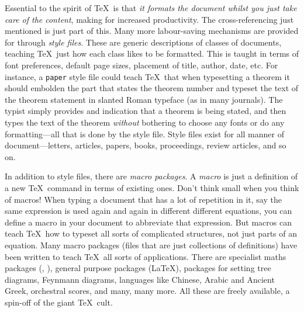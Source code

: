 Essential to the spirit of \TeX\ is that {\em it formats the document whilst
you just take care of the content}, making for increased productivity.
The cross-referencing just mentioned is just part of this.  Many more
labour-saving mechanisms are provided for through {\em style files}.
These are generic descriptions of classes of documents, teaching \TeX\
just how each class likes to be formatted.  This is taught in terms
of font preferences, default page sizes, placement of title, author, date,
etc.  For instance, a {\tt paper} style file could teach \TeX\ that
when typesetting a theorem it should embolden the part that states
the theorem number and typeset the text of the theorem statement
in slanted Roman typeface (as in many journals).  The typist simply
provides and indication that a theorem is being stated, and then
types the text of the theorem {\em without\/} bothering to choose
any fonts or do any formatting---all that is done by the style
file.  Style files exist for all manner of document---letters,
articles, papers, books, proceedings, review articles, and so on.

In addition to style files, there are {\em macro packages}.  A
{\em macro\/} is just a definition of a new \TeX\ command
in terms of existing ones.  Don't think small when you think of
macros!  When typing a document that has a lot of repetition
in it, say the same expression is used again and again in different
different equations, you can define a macro in  your document
to abbreviate that expression.  But macros can teach \TeX\
how to typeset all sorts of complicated structures, not just
parts of an equation.  Many macro packages (files that are
just collections of definitions) have been written to teach \TeX\
all sorts of applications.  There are specialist maths packages
(\AmSTeX, \AmSLaTeX), general purpose packages (\LaTeX),
packages for setting tree diagrams, Feynmann diagrams,
languages like Chinese, Arabic and Ancient Greek,
orchestral scores, and many, many more.  All these are
freely available, a spin-off of the giant \TeX\ cult.

